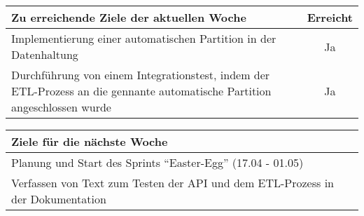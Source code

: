 \begin{tabularx}{\textwidth}{Xc}
    \arrayrulecolor{OliveGreen}
    \toprule
    {\bfseries Zu erreichende Ziele der aktuellen Woche} & {\bfseries Erreicht} \\
    \midrule[2pt]
    Implementierung einer automatischen Partition in der Datenhaltung  &  Ja \\
    \rowcolor{OliveGreen!15}
    Durchführung von einem Integrationstest, indem der ETL-Prozess an die
    gennante automatische Partition angeschlossen wurde  &  Ja  \\
    \bottomrule[2pt]
\end{tabularx}
%
\vspace{1cm}
%
\begin{tabularx}{\textwidth}{Xc}
    \arrayrulecolor{OliveGreen}
    \toprule
    {\bfseries Ziele für die nächste Woche}              &                   \\
    \midrule[2pt]
    Planung und Start des Sprints ``Easter-Egg'' (17.04 - 01.05)  &  \\
    \rowcolor{OliveGreen!15}
    Verfassen von Text zum Testen der API und dem ETL-Prozess in der
    Dokumentation  &  \\
\end{tabularx}
